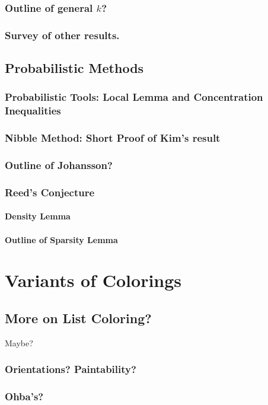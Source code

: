 \documentclass[12pt,twoside,openright,a4paper]{book}
\begin{document}
\section{Outline of general $k$?}
\section{Survey of other results.}

\chapter{Probabilistic Methods}
\section{Probabilistic Tools: Local Lemma and Concentration Inequalities}
\section{Nibble Method: Short Proof of Kim's result}
\section{Outline of Johansson?}
\section{Reed's Conjecture}
\subsection{Density Lemma}
\subsection{Outline of Sparsity Lemma}

\part{Variants of Colorings}

\chapter{More on List Coloring?}

Maybe?

\section{Orientations? Paintability?}
\section{Ohba's?}
\end{document}
